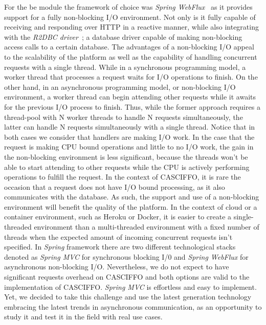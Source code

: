 For the \acrshort{be} module the framework of choice was \textit{Spring WebFlux}~\cite{spring-webflux} as it provides support for a fully non-blocking I/O environment. Not only is it fully capable of receiving and responding over HTTP in a reactive manner, while also integrating with the \textit{R2DBC driver}~\cite{r2dbc}; a database driver capable of making non-blocking access calls to a certain database. 
The advantages of a non-blocking I/O appeal to the scalability of the platform as well as the capability of handling concurrent requests with a single thread. While in a synchronous programming model, a worker thread that processes a request waits for I/O operations to finish. On the other hand, in an asynchronous programming model, or non-blocking I/O environment, a worker thread can begin attending other requests while it awaits for the previous I/O process to finish. 
Thus, while the former approach requires a thread-pool with N worker threads to handle N requests simultaneously, the latter can handle N requests simultaneously with a single thread. Notice that in both cases we consider that handlers are making I/O work. 
In the case that the request is making CPU bound operations and little to no I/O work, the gain in the non-blocking environment is less significant, because the threads won't be able to start attending to other requests while the CPU is actively performing operations to fulfill the request. 
In the context of CASCIFFO, it is rare the occasion that a request does not have I/O bound processing, as it also communicates with the database. As such, the support and use of a non-blocking environment will benefit the quality of the platform.
In the context of cloud or a container environment, such as Heroku or Docker, it is easier to create a single-threaded environment than a multi-threaded environment with a fixed number of threads when the expected amount of incoming concurrent requests isn't specified.
In \textit{Spring} framework there are two different technological stacks denoted as \textit{Spring MVC} for synchronous blocking I/0 and \textit{Spring WebFlux} for asynchronous non-blocking I/O. Nevertheless, we do not expect to have significant requests overhead on CASCIFFO and both options are valid to the implementation of CASCIFFO. \textit{Spring MVC} is effortless and easy to implement. Yet, we decided to take this challenge and use the latest generation technology embracing the latest trends in asynchronous communication, as an opportunity to study it and test it in the field with real use cases.

